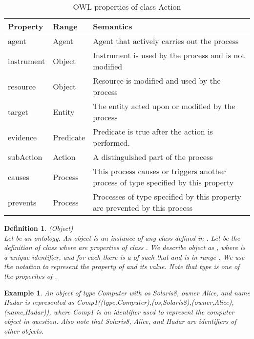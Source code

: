 \documentclass[12pt,journal,letterpaper,onecolumn]{IEEEtran}
\newtheorem{definition}{Definition}[section]
\newtheorem{example}{Example}[section]
\begin{document}
\begin{table}[h]
\begin{center}
\begin{minipage}{5in}
\footnotesize
\begin{tabular}{|l|l|p{3in}|}
\hline
Property & Range & Semantics \\
\hline
agent & Agent & Agent that actively carries out the process\\
instrument & Object & Instrument is used by the process and is not modified\\
resource & Object & Resource is modified and used by the process\\
target & Entity & The entity acted upon or modified by the process\\
evidence & Predicate & Predicate is true after the action is performed. \\
subAction & Action & A distinguished part of the process \\
causes & Process & This process causes or triggers another process of type specified by this property\\
prevents & Process &  Processes of type specified by this property are prevented by this process \\
\hline
\end{tabular}
\normalsize
\end{minipage}
\caption{OWL properties of class Action} \label{table:action}
\end{center}
\end{table}



\begin{definition}(Object)\\
Let  be an ontology. An object is an instance of any class 
defined in . Let  be the
definition of class  where  are properties
of class . We describe object  as
 ,
where  is a unique identifier, and for each 
there is a  of  such that 
and  is in range . We use the notation
 to represent the  property of  and
its value. Note that {\ttfamily type} is one of the properites
of . \label{def:object}
\end{definition}

\begin{example} An object of type {\ttfamily Computer} with
os {\ttfamily Solaris8}, owner {\ttfamily Alice}, and name
{\ttfamily Hadar} is represented as {\ttfamily
Comp1((type,Computer),(os,Solaris8)},{\ttfamily(owner,Alice)}, {\ttfamily(name,Hadar))},
where {\ttfamily Comp1} is an identifier used to represent the
computer object in question. Also note that {\ttfamily Solaris8},
{\ttfamily Alice}, and {\ttfamily Hadar} are identifiers of other
objects. \label{eg:object}
\end{example}
\end{document}
